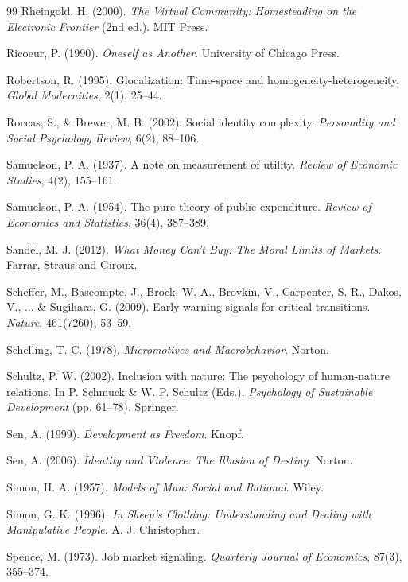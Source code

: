 \begin{thebibliography}{99}
Rheingold, H. (2000).
\textit{The Virtual Community: Homesteading on the Electronic Frontier} (2nd ed.).
MIT Press.

Ricoeur, P. (1990).
\textit{Oneself as Another}.
University of Chicago Press.

Robertson, R. (1995).
Glocalization: Time-space and homogeneity-heterogeneity.
\textit{Global Modernities}, 2(1), 25--44.

Roccas, S., \& Brewer, M. B. (2002).
Social identity complexity.
\textit{Personality and Social Psychology Review}, 6(2), 88--106.

Samuelson, P. A. (1937).
A note on measurement of utility.
\textit{Review of Economic Studies}, 4(2), 155--161.

Samuelson, P. A. (1954).
The pure theory of public expenditure.
\textit{Review of Economics and Statistics}, 36(4), 387--389.

Sandel, M. J. (2012).
\textit{What Money Can't Buy: The Moral Limits of Markets}.
Farrar, Straus and Giroux.

Scheffer, M., Bascompte, J., Brock, W. A., Brovkin, V., Carpenter, S. R., Dakos, V., ... \& Sugihara, G. (2009).
Early-warning signals for critical transitions.
\textit{Nature}, 461(7260), 53--59.

Schelling, T. C. (1978).
\textit{Micromotives and Macrobehavior}.
Norton.

Schultz, P. W. (2002).
Inclusion with nature: The psychology of human-nature relations.
In P. Schmuck \& W. P. Schultz (Eds.), \textit{Psychology of Sustainable Development} (pp. 61--78).
Springer.

Sen, A. (1999).
\textit{Development as Freedom}.
Knopf.

Sen, A. (2006).
\textit{Identity and Violence: The Illusion of Destiny}.
Norton.

Simon, H. A. (1957).
\textit{Models of Man: Social and Rational}.
Wiley.

Simon, G. K. (1996).
\textit{In Sheep's Clothing: Understanding and Dealing with Manipulative People}.
A. J. Christopher.

Spence, M. (1973).
Job market signaling.
\textit{Quarterly Journal of Economics}, 87(3), 355--374.


\end{thebibliography}
